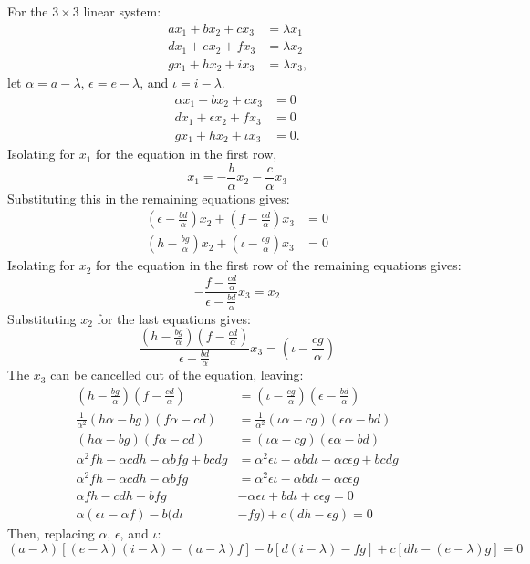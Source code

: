 For the $3 \times 3$ linear system:
\begin{align*}
	ax_1 + bx_2 + cx_3 &= \lambda x_1 \\
	dx_1 + ex_2 + fx_3 &= \lambda x_2 \\
	gx_1 + hx_2 + ix_3 &= \lambda x_3 \text{,}
\end{align*}
let $\alpha = a - \lambda$, $\epsilon = e - \lambda$, and $\iota = i - \lambda$.
\begin{align*}
	\alpha x_1 + bx_2 + cx_3 &= 0 \\
	dx_1 + \epsilon x_2 + fx_3 &= 0 \\
	gx_1 + hx_2 + \iota x_3 &= 0 \text{.}
\end{align*}
Isolating for $x_1$ for the equation in the first row,
\begin{equation*}
	x_1 = - \frac{b}{\alpha} x_2 - \frac{c}{\alpha} x_3
\end{equation*}
Substituting this in the remaining equations gives:
\begin{align*}
	\left(\epsilon - \frac{bd}{\alpha}\right)x_2 + \left(f - \frac{cd}{\alpha}\right)x_3 &= 0 \\
	\left(h - \frac{bg}{\alpha}\right)x_2 + \left(\iota - \frac{cg}{\alpha}\right)x_3 &= 0 
\end{align*}
Isolating for $x_2$ for the equation in the first row of the remaining equations gives:
\begin{equation*}
	-\frac{f - \frac{cd}{\alpha}}{\epsilon - \frac{bd}{\alpha}}x_3 = x_2
\end{equation*}
Substituting $x_2$ for the last equations gives:
\begin{equation*}
	\frac{\left(h- \frac{bg}{\alpha}\right)\left(f - \frac{cd}{\alpha}\right)}{\epsilon - \frac{bd}{\alpha}}x_3 = \left(\iota - \frac{cg}{\alpha}\right)
\end{equation*}
The $x_3$ can be cancelled out of the equation, leaving:
\begin{align*}
	\left(h - \frac{bg}{\alpha}\right)\left(f - \frac{cd}{\alpha}\right) &= \left(\iota - \frac{cg}{\alpha}\right)\left(\epsilon - \frac{bd}{\alpha}\right) \\
	\frac{1}{\alpha^2}(h\alpha - bg)(f\alpha - cd) &= \frac{1}{\alpha^2}(\iota \alpha - cg)(\epsilon \alpha - bd) \\
	(h\alpha - bg)(f\alpha - cd) &= (\iota \alpha - cg)(\epsilon \alpha - bd) \\
	\alpha^2fh - \alpha cdh - \alpha bfg + bcdg &= \alpha^2 \epsilon \iota - \alpha bd \iota - \alpha c \epsilon g + bcdg \\
	\alpha^2fh - \alpha cdh - \alpha bfg &= \alpha^2 \epsilon \iota - \alpha bd \iota - \alpha c \epsilon g \\
	\alpha fh - cdh - bfg& - \alpha \epsilon \iota + bd \iota + c \epsilon g = 0 \\
	\alpha (\epsilon \iota - \alpha f) - b(d \iota& - fg) + c(dh - \epsilon g) = 0
\end{align*}
Then, replacing $\alpha$, $\epsilon$, and $\iota$:
\begin{equation*}
	(a - \lambda)[(e - \lambda)(i - \lambda) - (a - \lambda)f] - b[d(i - \lambda) - fg] + c[dh - (e- \lambda)g] = 0
\end{equation*}

